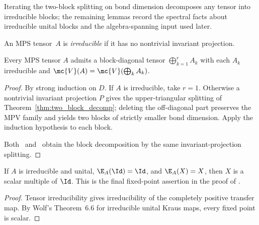 Iterating the two-block splitting on bond dimension decomposes any tensor into
irreducible blocks; the remaining lemmas record the spectral facts about
irreducible unital blocks and the algebra-spanning input used later.

\begin{definition}\label{def:irreducible_tensor}
    \leanok
    An MPS tensor~$A$ is \emph{irreducible} if it has no nontrivial invariant
    projection.
\end{definition}

\begin{theorem}\label{thm:irred_decomp}
    \leanok
    Every MPS tensor $A$ admits a block-diagonal tensor $\bigoplus_{k=1}^r A_k$
    with each $A_k$ irreducible and $\mc{V}(A) = \mc{V}(\bigoplus_k A_k)$.
\end{theorem}

\begin{proof}
    \leanok
    By strong induction on $D$. If $A$ is irreducible, take $r = 1$. Otherwise a
    nontrivial invariant projection $P$ gives the upper-triangular splitting of
    Theorem~\ref{thm:two_block_decomp}; deleting the off-diagonal part preserves
    the MPV family and yields two blocks of strictly smaller bond dimension.
    Apply the induction hypothesis to each block.

    Both~\cite[Theorem~4]{PerezGarcia2007Matrix}
    and~\cite[Section~IV.A.1]{Cirac2021Matrix} obtain the block decomposition by
    the same invariant-projection splitting.
\end{proof}

\begin{theorem}%
    \label{thm:irreducible_unital_scalar_fixed_point}
    \leanok
    If $A$ is irreducible and unital, $\E_A(\Id)=\Id$, and $\E_A(X)=X$, then $X$
    is a scalar multiple of $\Id$. This is the final fixed-point assertion in the
    proof of \cite[Theorem~4]{PerezGarcia2007Matrix}.
\end{theorem}

\begin{proof}\leanok
    Tensor irreducibility gives irreducibility of the completely positive
    transfer map. By Wolf's Theorem~6.6 for irreducible unital Kraus maps, every
    fixed point is scalar.
\end{proof}

